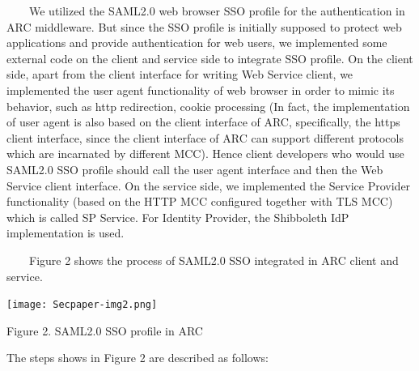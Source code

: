 \documentclass{article}
\begin{document}
\ \ \ \ We utilized the SAML2.0 web browser SSO profile for the
authentication in ARC middleware. But since the SSO profile is
initially supposed to protect web applications and provide
authentication for web users, we implemented some external code on the
client and service side to integrate SSO profile. On the client side,
apart from the client interface for writing Web Service client, we
implemented the user agent functionality of web browser in order to
mimic its behavior, such as http redirection, cookie processing (In
fact, the implementation of user agent is also based on the client
interface of ARC, specifically, the https client interface, since the
client interface of ARC can support different protocols which are
incarnated by different MCC). Hence client developers who would use
SAML2.0 SSO profile should call the user agent interface and then the
Web Service client interface. On the service side, we implemented the
Service Provider functionality (based on the HTTP MCC configured
together with TLS MCC) which is called SP Service. For Identity
Provider, the Shibboleth IdP implementation is used.

\ \ \ \ Figure 2 shows the process of SAML2.0 SSO integrated in ARC
client and service.



\begin{center}
\texttt{[image: Secpaper-img2.png]}
\end{center}

\bigskip

{\centering
Figure 2. SAML2.0 SSO profile in ARC
\par}

The steps shows in Figure 2 are described as follows:
\end{document}
